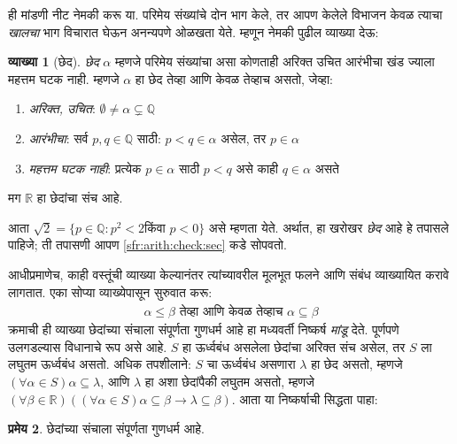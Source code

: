 \documentclass[11pt,a4paper,openany]{book}
\theoremstyle{definition}
\newtheorem{defn}{व्याख्या}[section]
\newtheorem{thm}[defn]{प्रमेय}
\newcommand{\Setabs}[2]{\{#1:#2\}}
\newcommand{\Rat}{\mathbb{Q}}
\newcommand{\Real}{\mathbb{R}}
\newcommand{\lif}{\mathbin{\to}}
\begin{document}
ही मांडणी नीट नेमकी करू या. परिमेय संख्यांचे दोन भाग केले, तर आपण केलेले
विभाजन केवळ त्याचा \emph{खालचा} भाग विचारात घेऊन अनन्यपणे ओळखता येते.
म्हणून नेमकी पुढील व्याख्या देऊ:

\begin{defn}[छेद]
\emph{छेद} $\alpha$ म्हणजे परिमेय संख्यांचा असा कोणताही अरिक्त उचित
आरंभीचा खंड ज्याला महत्तम घटक नाही. म्हणजे $\alpha$ हा छेद तेव्हा आणि
केवळ तेव्हाच असतो, जेव्हा:
\begin{enumerate}
	\item \emph{अरिक्त, उचित}: $\emptyset \neq \alpha \subsetneq \Rat$
	\item \emph{आरंभीचा}: सर्व $p,q \in \Rat$ साठी: $p < q \in \alpha$ असेल, तर $p \in \alpha$
	\item \emph{महत्तम घटक नाही}: प्रत्येक $p \in \alpha$ साठी $p < q$ असे काही $q \in \alpha$ असते
\end{enumerate}
मग $\Real$ हा छेदांचा संच आहे.
\end{defn}

आता $\sqrt{2} = \Setabs{p \in \Rat}{p^2 < 2\text{
किंवा }p < 0}$ असे म्हणता येते. अर्थात, हा खरोखर \emph{छेद} आहे हे
तपासले पाहिजे; ती तपासणी आपण \ref{sfr:arith:check:sec} कडे सोपवतो.

आधीप्रमाणेच, काही वस्तूंची व्याख्या केल्यानंतर त्यांच्यावरील मूलभूत
फलने आणि संबंध व्याख्यायित करावे लागतात. एका सोप्या व्याख्येपासून सुरुवात करू:
\begin{align*}
	\alpha \leq \beta \text{ तेव्हा आणि केवळ तेव्हाच }\alpha \subseteq \beta
\end{align*}
क्रमाची ही व्याख्या छेदांच्या संचाला संपूर्णता गुणधर्म आहे हा मध्यवर्ती
निष्कर्ष \emph{मांडू} देते. पूर्णपणे उलगडल्यास विधानाचे रूप असे आहे.
$S$ हा ऊर्ध्वबंध असलेला छेदांचा अरिक्त संच असेल, तर $S$ ला लघुतम
ऊर्ध्वबंध असतो. अधिक तपशीलाने: $S$ चा ऊर्ध्वबंध असणारा $\lambda$ हा छेद
असतो, म्हणजे $(\forall \alpha \in S)\alpha \subseteq \lambda$, आणि
$\lambda$ हा अशा छेदांपैकी लघुतम असतो, म्हणजे $(\forall \beta \in \Real)((\forall \alpha \in S)\alpha \subseteq \beta \lif \lambda \subseteq \beta)$. आता या निष्कर्षाची सिद्धता पाहा:

\begin{thm}\label{sfr:arith:cuts:realcompleteness}
छेदांच्या संचाला संपूर्णता गुणधर्म आहे.
\end{thm}
\end{document}
